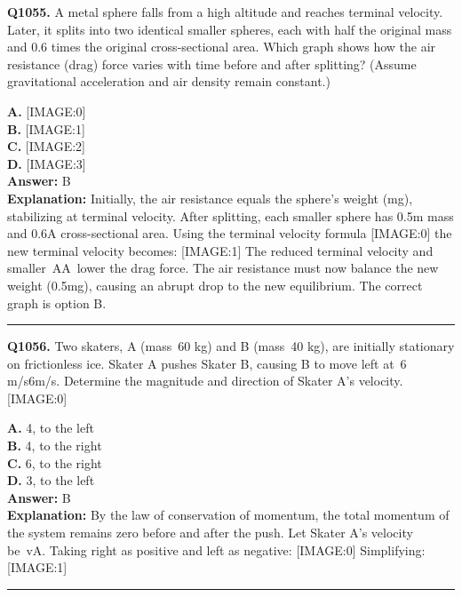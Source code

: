 \documentclass[12pt]{article}
\begin{document}
\noindent
\textbf{Q1055.} A metal sphere falls from a high altitude and reaches terminal velocity. Later, it splits into two identical smaller spheres, each with half the original mass and 0.6 times the original cross-sectional area. Which graph shows how the air resistance (drag) force varies with time before and after splitting? (Assume gravitational acceleration and air density remain constant.)



\textbf{A.} [IMAGE:0] \\
\textbf{B.} [IMAGE:1] \\
\textbf{C.} [IMAGE:2] \\
\textbf{D.} [IMAGE:3] \\

\textbf{Answer:} B \\
\textbf{Explanation:} Initially, the air resistance equals the sphere’s weight (mg), stabilizing at terminal velocity. After splitting, each smaller sphere has 0.5m mass and 0.6A cross-sectional area. Using the terminal velocity formula
[IMAGE:0]
the new terminal velocity becomes:
[IMAGE:1]
The reduced terminal velocity and smaller AA lower the drag force. The air resistance must now balance the new weight (0.5mg), causing an abrupt drop to the new equilibrium. The correct graph is option B.

\hrule
\vspace{1em}


\noindent
\textbf{Q1056.} Two skaters, A (mass 60
kg) and B (mass 40
kg), are initially stationary on frictionless ice. Skater A pushes Skater B, causing B to move left at 6
m/s6m/s. Determine the magnitude and direction of Skater A’s velocity.
[IMAGE:0]



\textbf{A.} 4, to the left \\
\textbf{B.} 4, to the right \\
\textbf{C.} 6, to the right \\
\textbf{D.} 3, to the left \\

\textbf{Answer:} B \\
\textbf{Explanation:} By the law of conservation of momentum, the total momentum of the system remains zero before and after the push.
Let Skater A’s velocity be vA. Taking right as positive and left as negative:
[IMAGE:0]
Simplifying:
[IMAGE:1]

\hrule
\vspace{1em}
\end{document}
